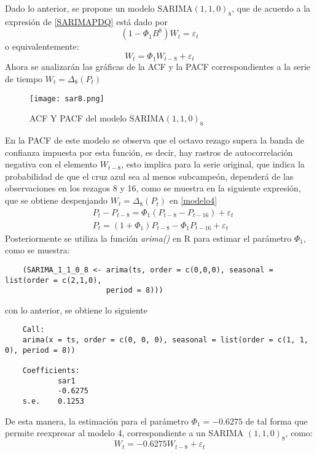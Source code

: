 \documentclass{article}
\theoremstyle{remark}
\begin{document}
Dado lo anterior, se propone un modelo SARIMA$(1,1,0)_8$, que de acuerdo a la expresión de \eqref{SARIMAPDQ} está dado por 
\begin{equation*}
    (1 - \Phi_1B^8)W_t =\varepsilon_t 
\end{equation*}
o equivalentemente:
\begin{equation}\label{modelo4}
    W_t = \Phi_1W_{t-8} + \varepsilon_t 
\end{equation}
Ahora se analizarán las gr\'aficas de la ACF y la PACF correspondientes a la serie de tiempo $W_t = \Delta_8(P_t) $    
\begin{figure}[H]
\centering
\texttt{[image: sar8.png]}
\caption{ACF Y PACF del modelo SARIMA$(1,1,0)_8$ }
\label{sar8}
\end{figure}

En la PACF de este modelo se observa que el octavo rezago supera la banda de confianza impuesta por esta función, es decir, hay rastros de autocorrelación  negativa con el elemento $W_{t-8}$, esto implica para la serie original, que indica la probabilidad de que el cruz azul sea al menos subcampeón, dependerá de las observaciones en los rezagos 8 y 16, como se muestra en la siguiente expresión, que se obtiene despenjando $W_t = \Delta_8(P_t) $ en \eqref{modelo4}
\begin{align*}
    & P_t - P_{t-8} =   \Phi_1(P_{t-8} - P_{t-16}) + \varepsilon_t\\
    & P_t =  (1+ \Phi_1)P_{t-8} -  \Phi_1P_{t-16} + \varepsilon_t
\end{align*}
Posteriormente se utiliza la función \textit{arima()} en R para estimar el parámetro $\Phi_1$, como se muestra:
\begin{verbatim}
    (SARIMA_1_1_0_8 <- arima(ts, order = c(0,0,0), seasonal = list(order = c(2,1,0), 
                       period = 8))) 
\end{verbatim}
con lo anterior, se obtiene lo siguiente
\begin{verbatim}          
    Call:
    arima(x = ts, order = c(0, 0, 0), seasonal = list(order = c(1, 1, 0), period = 8))

    Coefficients:
            sar1
            -0.6275
    s.e.    0.1253
\end{verbatim}
De esta manera, la estimación para el parámetro $\Phi_1=-0.6275$ de tal forma que permite reexpresar al modelo 4, correspondiente a un SARIMA $(1,1,0)_8$, como:
\begin{equation*}
    W_t = -0.6275W_{t-8} + \varepsilon_t 
\end{equation*}
\end{document}
